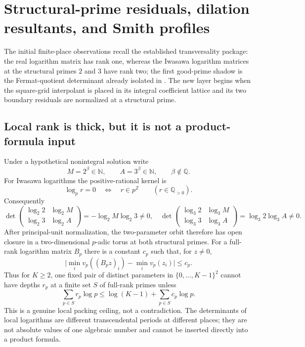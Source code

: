 \documentclass[11pt,oneside]{article}
\theoremstyle{definition}
\theoremstyle{remark}
\newcommand{\N}{\mathbb N}
\newcommand{\Z}{\mathbb Z}
\newcommand{\Q}{\mathbb Q}
\newcommand{\lean}[1]{\texttt{\detokenize{#1}}}
\begin{document}
\section{Structural-prime residuals, dilation resultants, and Smith profiles}
\label{sec:structural-residuals}

The initial finite-place observations recall the established transversality package: the real
logarithm matrix has rank one, whereas
the Iwasawa logarithm matrices at the structural primes $2$ and $3$ have rank two; the first
good-prime shadow is the Fermat-quotient determinant already isolated in
\lean{FermatQuotientDeterminant}.  The new layer begins when the square-grid
interpolant is placed in its integral coefficient lattice and its two boundary residuals are
normalized at a structural prime.

\subsection{Local rank is thick, but it is not a product-formula input}
\label{res:local-rank}

Under a hypothetical nonintegral solution write
\[
 M=2^\beta\in\N,\qquad A=3^\beta\in\N,\qquad \beta\notin\Q.
\]
For Iwasawa logarithms the positive-rational kernel is
\[
 \log_p r=0\quad\Longleftrightarrow\quad r\in p^\Z
 \qquad(r\in\Q_{>0}).
\]
Consequently
\[
 \det\begin{pmatrix}\log_2 2&\log_2M\\ \log_2 3&\log_2A\end{pmatrix}
   =-\log_2M\log_2 3\ne0,
\quad
 \det\begin{pmatrix}\log_3 2&\log_3M\\ \log_3 3&\log_3A\end{pmatrix}
   =\log_3 2\log_3A\ne0.
\]
After principal-unit normalization, the two-parameter orbit therefore has open closure in a
two-dimensional $p$-adic torus at both structural primes.  For a full-rank logarithm matrix
$B_p$ there is a constant $c_p$ such that, for $z\ne0$,
\[
 \bigl|\min_i v_p((B_pz)_i)-\min_i v_p(z_i)\bigr|\le c_p.
\]
Thus for $K\ge2$, one fixed pair of distinct parameters in $\{0,\ldots,K-1\}^2$ cannot have
depths $r_p$ at a finite set $S$ of full-rank primes unless
\begin{equation}
 \sum_{p\in S}r_p\log p
 \le \log(K-1)+\sum_{p\in S}c_p\log p.
 \label{res:eq-collision-budget}
\end{equation}
This is a genuine local packing ceiling, not a contradiction.  The determinants of local
logarithms are different transcendental periods at different places; they are not absolute
values of one algebraic number and cannot be inserted directly into a product formula.
\end{document}
